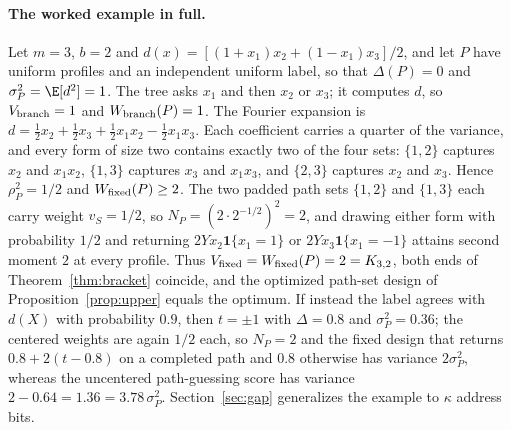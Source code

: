 \paragraph{The worked example in full.}
Let $m=3$, $b=2$ and $d(x)=[(1+x_1)x_2+(1-x_1)x_3]/2$, and let $P$ have uniform profiles and an independent uniform label, so that $\Delta(P)=0$ and $\sigma_P^2=\E[d^2]=1$. The tree asks $x_1$ and then $x_2$ or $x_3$; it computes $d$, so $V_{\rm branch}=1$ and $W_{\rm branch}(P)=1$. The Fourier expansion is $d=\tfrac12x_2+\tfrac12x_3+\tfrac12x_1x_2-\tfrac12x_1x_3$. Each coefficient carries a quarter of the variance, and every form of size two contains exactly two of the four sets: $\{1,2\}$ captures $x_2$ and $x_1x_2$, $\{1,3\}$ captures $x_3$ and $x_1x_3$, and $\{2,3\}$ captures $x_2$ and $x_3$. Hence $\rho_P^2=1/2$ and $W_{\rm fixed}(P)\ge2$. The two padded path sets $\{1,2\}$ and $\{1,3\}$ each carry weight $v_S=1/2$, so $N_P=(2\cdot2^{-1/2})^2=2$, and drawing either form with probability $1/2$ and returning $2Yx_2\mathbf1\{x_1=1\}$ or $2Yx_3\mathbf1\{x_1=-1\}$ attains second moment $2$ at every profile. Thus $V_{\rm fixed}=W_{\rm fixed}(P)=2=K_{3,2}$, both ends of Theorem~\ref{thm:bracket} coincide, and the optimized path-set design of Proposition~\ref{prop:upper} equals the optimum. If instead the label agrees with $d(X)$ with probability $0.9$, then $t=\pm1$ with $\Delta=0.8$ and $\sigma_P^2=0.36$; the centered weights are again $1/2$ each, so $N_P=2$ and the fixed design that returns $0.8+2(t-0.8)$ on a completed path and $0.8$ otherwise has variance $2\sigma_P^2$, whereas the uncentered path-guessing score has variance $2-0.64=1.36=3.78\,\sigma_P^2$. Section~\ref{sec:gap} generalizes the example to $\kappa$ address bits.
